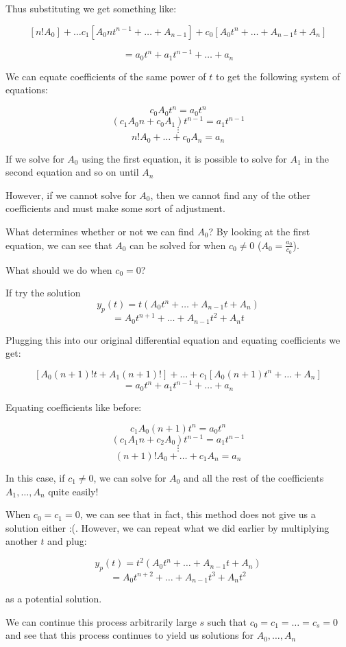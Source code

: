 \documentclass{report}
\begin{document}
{Thus substituting we get something like:

$$[n!A_0] + \dots c_1[A_0nt^{n-1}+\dots+A_{n-1}] + c_0[A_0t^n + \dots + A_{n-1}t + A_n]$$

$$= a_0t^n + a_1t^{n-1} + \dots + a_n$$

We can equate coefficients of the same power of $t$ to get the following system of equations:

$$c_0A_0t^n = a_0t^n$$
$$(c_1A_0n + c_0A_1)t^{n-1} = a_1t^{n-1}$$
$$\vdots$$
$$n!A_0 + \dots + c_0A_n = a_n$$


If we solve for $A_0$ using the first equation, it is possible to solve for $A_1$ in the second equation and so on until $A_n$

However, if we cannot solve for $A_0$, then we cannot find any of the other coefficients and must make some sort of adjustment.

What determines whether or not we can find $A_0$? By looking at the first equation, we can see that $A_0$ can be solved for when $c_0 \neq 0$ ($A_0 = \frac{a_0}{c_0}$).

What should we do when $c_0 = 0$?

If try the solution
$$y_p(t) = t(A_0t^n + \dots + A_{n-1}t + A_n)$$
$$=A_0t^{n+1} + \dots + A_{n-1}t^2 + A_nt$$


Plugging this into our original differential equation and equating coefficients we get:

$$[A_0(n+1)!t+A_1(n+1)!] + \dots + c_1[A_0(n+1)t^n+\dots + A_n]$$
$$= a_0t^n + a_1t^{n-1} + \dots + a_n$$

Equating coefficients like before:

$$c_1A_0(n+1)t^n = a_0t^n$$
$$(c_1A_1n+c_2A_0)t^{n-1} = a_1t^{n-1}$$
$$\vdots$$
$$(n+1)!A_0 + \dots + c_1A_{n} = a_n$$

In this case, if $c_1 \neq 0$, we can solve for $A_0$ and all the rest of the coefficients $A_1, \dots, A_n$ quite easily!

When $c_0=c_1=0$, we can see that in fact, this method does not give us a solution either :(. However, we can repeat what we did earlier by multiplying another $t$ and plug:

$$y_p(t) = t^2(A_0t^n + \dots + A_{n-1}t + A_n)$$
$$=A_0t^{n+2} + \dots + A_{n-1}t^3 + A_nt^2$$

as a potential solution.

We can continue this process arbitrarily large $s$ such that $c_0=c_1=\dots=c_s=0$ and see that this process continues to yield us solutions for $A_0, \dots, A_n$


}
\end{document}
